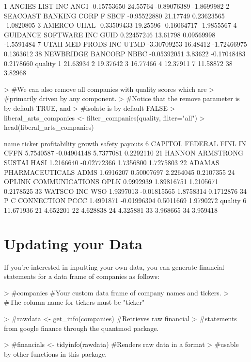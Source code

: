 \documentclass[titlepage]{article}
\begin{document}
\begin{Schunk}
\begin{Soutput}
1          ANGIES LIST INC   ANGI   -0.15753650 24.55764 -0.89076389 -1.8699982
2  SEACOAST BANKING CORP F   SBCF   -0.95522880 21.17749  0.23623565 -1.0820805
3                   AMERCO   UHAL   -0.33509433 19.25596 -0.16064717 -1.9855567
4    GUIDANCE SOFTWARE INC   GUID    0.22457246 13.61798  0.09569998 -1.5591484
7       UTAH MED PRODS INC   UTMD   -3.30709253 16.48412 -1.72466975  0.1363612
38       NEWBRIDGE BANCORP   NBBC   -0.05392051  3.83622 -0.17048483  0.2178660
    quality
1  21.63934
2  19.37642
3  16.77466
4  12.37911
7  11.58872
38  3.82968
\end{Soutput}
\begin{Sinput}
> #We can also remove all companies with quality scores which are 
> #primarily driven by any component.
> #Notice that the remove parameter is by default TRUE, and 
> #isolate is by default FALSE
> liberal_arts_companies <- filter_companies(quality, filter="all")
> head(liberal_arts_companies)
\end{Sinput}
\begin{Soutput}
                      name ticker profitability      growth    safety   payouts
6  CAPITOL FEDERAL FINL IN   CFFN     5.7540587 -0.04904148 5.7377081 0.2292110
21 HANNON ARMSTRONG SUSTAI   HASI     1.2166640 -0.02772366 1.7356800 1.7275803
22  ADAMAS PHARMACEUTICALS   ADMS     1.6916207  0.50007697 2.2264045 0.2107355
24   OPLINK COMMUNICATIONS   OPLK     0.9992939  1.89816751 1.2105671 0.2178525
33              WATSCO INC    WSO     1.9397013 -0.01815565 1.8758314 0.1712876
34          P C CONNECTION   PCCC     1.4991871 -0.01996304 0.5011669 1.9790272
     quality
6  11.671936
21  4.652201
22  4.628838
24  4.325881
33  3.968665
34  3.959418
\end{Soutput}
\end{Schunk}


\section*{Updating your Data}
If you're interested in inputting your own data, you can generate financial statements for a data frame of companies as follows:

\begin{Schunk}
\begin{Sinput}
> #companies #Your custom data frame of company names and tickers. 
> #The column name for tickers must be "ticker"
\end{Sinput}
\end{Schunk}
\begin{Schunk}
\begin{Sinput}
> #rawdata <- get_info(companies) #Retrieves raw financial 
> #statements from google finance through the quantmod package.
\end{Sinput}
\end{Schunk}
\begin{Schunk}
\begin{Sinput}
> #financials <- tidyinfo(rawdata) #Renders raw data in a format 
> #usable by other functions in this package.
\end{Sinput}
\end{Schunk}
\end{document}
